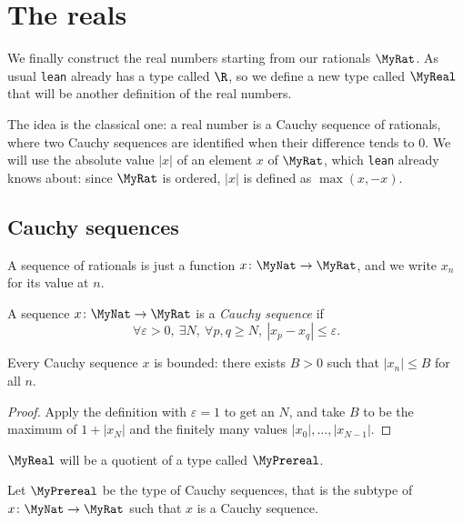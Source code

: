 \chapter{The reals}

We finally construct the real numbers starting from our rationals $\MyRat$. As usual \texttt{lean}
already has a type called $\R$, so we define a new type called $\MyReal$ that will be another
definition of the real numbers.

The idea is the classical one: a real number is a Cauchy sequence of rationals, where two Cauchy
sequences are identified when their difference tends to $0$. We will use the absolute value $|x|$
of an element $x$ of $\MyRat$, which \texttt{lean} already knows about: since $\MyRat$ is ordered,
$|x|$ is defined as $\max(x, -x)$.

\section{Cauchy sequences}

A sequence of rationals is just a function $x \colon \MyNat \to \MyRat$, and we write $x_n$ for its
value at $n$.

\begin{definition}
    \label{IsCauchy}
    \leanok
A sequence $x \colon \MyNat \to \MyRat$ is a \emph{Cauchy sequence} if
\[
\forall \varepsilon > 0, \ \exists N, \ \forall p, q \geq N, \ |x_p - x_q| \leq \varepsilon.
\]
\end{definition}

\begin{lemma}
    \label{IsCauchy.bounded}
    \leanok
    Every Cauchy sequence $x$ is bounded: there exists $B > 0$ such that $|x_n| \leq B$ for all $n$.
\end{lemma}
\begin{proof}
    \leanok
    Apply the definition with $\varepsilon = 1$ to get an $N$, and take $B$ to be the maximum of
    $1 + |x_N|$ and the finitely many values $|x_0|, \dots, |x_{N-1}|$.
\end{proof}

$\MyReal$ will be a quotient of a type called $\MyPrereal$.

\begin{definition}
    \label{MyPrereal}
    \leanok
Let $\MyPrereal$ be the type of Cauchy sequences, that is the subtype of $x \colon \MyNat \to \MyRat$
such that $x$ is a Cauchy sequence.
\end{definition}

